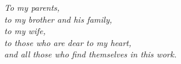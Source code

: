 
\begin{dedication} %
\textit{To my parents,\\
  to my brother and his family,\\
  to my wife,\\
  to those who are dear to my heart,\\
  and all those who find themselves in this work.}

\end{dedication}

